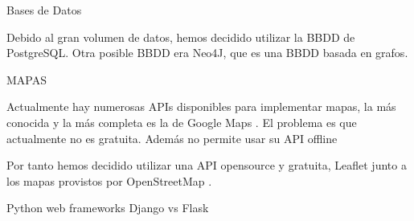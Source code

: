 Bases de Datos

Debido al gran volumen de datos, hemos decidido utilizar la BBDD de PostgreSQL\cite{postgres}.
Otra posible BBDD era Neo4J\cite{neo4j}, que es una BBDD basada en grafos.

MAPAS

Actualmente hay numerosas APIs disponibles para implementar mapas, la más conocida y la más completa es la de Google Maps \cite{gmaps}. El problema es que actualmente no es gratuita. Además no permite usar su API offline


Por tanto hemos decidido utilizar una API opensource y gratuita, Leaflet\cite{leaflet} junto a los mapas provistos por OpenStreetMap \cite{osm}.


Python web frameworks
Django vs Flask\cite{flask}


